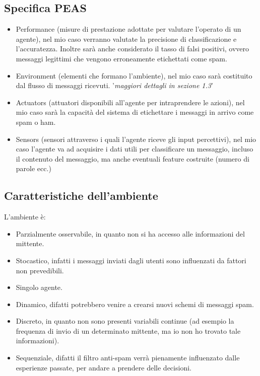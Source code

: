 \documentclass[]{article}
\begin{document}
    \subsection{Specifica PEAS}
        \begin{itemize}
            \item Performance (misure di prestazione adottate per valutare l’operato di un agente), nel mio caso verranno valutate la precisione di classificazione e l'accuratezza. Inoltre sarà anche considerato il tasso di falsi positivi, ovvero messaggi legittimi che vengono erroneamente etichettati come spam.
            \item Environment (elementi che formano l’ambiente), nel mio caso sarà costituito dal flusso di messaggi ricevuti. '\textit{maggiori dettagli in sezione 1.3}'
            \item Actuators (attuatori disponibili all’agente per intraprendere le azioni), nel mio caso sarà la capacità del sistema di etichettare i messaggi in arrivo come spam o ham.
            \item Sensors (sensori attraverso i quali l'agente riceve gli input percettivi), nel mio caso l'agente va ad acquisire i dati utili per classificare un messaggio, incluso il contenuto del messaggio, ma anche eventuali feature costruite (numero di parole ecc.)
        \end{itemize}

        \subsection{Caratteristiche dell'ambiente}
            L'ambiente è:
            \begin{itemize}
                \item Parzialmente osservabile, in quanto non si ha accesso alle informazioni del mittente.
                \item Stocastico, infatti i messaggi inviati dagli utenti sono influenzati da fattori non prevedibili.
                \item Singolo agente.
                \item Dinamico, difatti potrebbero venire a crearsi nuovi schemi di messaggi spam.
                \item Discreto, in quanto non sono presenti variabili continue (ad esempio la frequenza di invio di un determinato mittente, ma io non ho trovato tale informazioni).
                \item Sequenziale, difatti il filtro anti-spam verrà pienamente influenzato dalle esperienze passate, per andare a prendere delle decisioni.
            \end{itemize}
\end{document}
